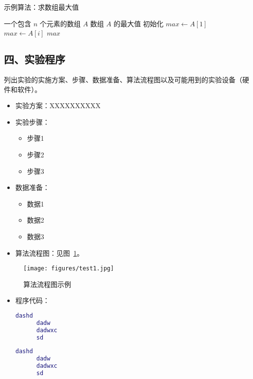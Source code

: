 \documentclass[12pt,a4paper,oneside,UTF8]{ctexart}
\begin{document}
  \begin{algorithm}[H]
    \caption{示例算法：求数组最大值}
    \label{alg:example}
    \begin{algorithmic}[1]
    \REQUIRE 一个包含 $n$ 个元素的数组 $A$
    \ENSURE 数组 $A$ 的最大值
    \STATE 初始化 $max \gets A[1]$
            \STATE $max \gets A[i]$
        \ENDIF
    \ENDFOR
    \RETURN $max$
    \end{algorithmic}
    \end{algorithm}
  
  
  \subsection*{四、实验程序}
列出实验的实施方案、步骤、数据准备、算法流程图以及可能用到的实验设备（硬件和软件）。\\
  \begin{itemize}
  \item 实验方案：XXXXXXXXXX
  \end{itemize}


  \begin{itemize}
      \item 实验步骤：
      \begin{itemize}
          \item 步骤1
          \item 步骤2
          \item 步骤3
      \end{itemize}
      \item 数据准备：
      \begin{itemize}
          \item 数据1
          \item 数据2
          \item 数据3
      \end{itemize}
      \item 算法流程图：见图~\ref{fig:test1}。
  \end{itemize}
\begin{figure}[H]
    \centering
    \texttt{[image: figures/test1.jpg]}
    \caption{算法流程图示例}
    \label{fig:test1}
  \end{figure}

  \begin{itemize}
    \item 程序代码：
    \begin{lstlisting}[language=matlab, caption=示例代码1, label={}]
      dashd
      dadw
      dadwxc
      sd
    \end{lstlisting}

    \begin{lstlisting}[language=matlab, caption=示例代码2, label={}]
      dashd
      dadw
      dadwxc
      sd
    \end{lstlisting}

  \end{itemize}
\end{document}
